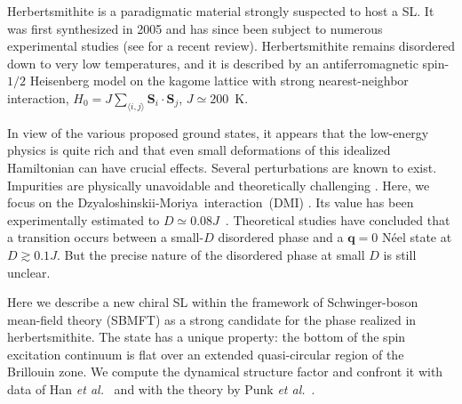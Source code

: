 \documentclass[aps,prl,twocolumn,superscriptaddress,showpacs,a4paper, longbibliography]{revtex4-1}
\newcommand{\DM}{Dzyaloshinskii-Moriya}
\begin{document}
Herbertsmithite is a paradigmatic material strongly suspected to host a SL.
It was first synthesized in 2005 \cite{Nocera} and has since been subject to numerous experimental studies \cite{Herbertsmithite_exp_H, Herbert_measurements, Mendels_Kag, DM_Bert, Herbert_measurements2, Nature_DM, Herbert_impurities, Zorko17_PRL.118.017202} (see \cite{Herbert_review} for a recent review).
Herbertsmithite remains disordered down to very low temperatures, and it is described by an antiferromagnetic spin-$1/2$ Heisenberg model on the kagome lattice with strong nearest-neighbor interaction, $H_0 = J\sum_{\langle i,j\rangle} \mathbf S_i\cdot \mathbf S_j$, $J \simeq 200$~K.

In view of the various proposed ground states, it appears that the low-energy physics is quite rich and that even small deformations of this idealized Hamiltonian can have crucial effects. Several perturbations are known to exist. Impurities are physically unavoidable \cite{Herbert_impurities} and theoretically challenging \cite{DM_impurity}.
Here, we focus on the \DM\ interaction~(DMI) \cite{Dzyaloshinskii, Moriya, DMsimple}. Its value has been experimentally estimated to $D\simeq0.08J$~\cite{DM_Bert}. Theoretical studies \cite{Elhajal, DM_Cepas, Moi_DM, DM_Fritz, DM_cluster, SFMFT_DM, Hering17_PRB.95.054418} have concluded that a transition occurs between a small-$D$ disordered phase and a $\mathbf q=0$  N\'eel state at $D \gtrsim 0.1J$.
But the precise nature of the disordered phase at small $D$ is still unclear.


Here we describe a new chiral SL within the framework of Schwinger-boson mean-field theory (SBMFT) as a strong candidate for the phase realized in herbertsmithite.
The state has a unique property: the bottom of the spin excitation continuum is flat over an extended quasi-circular region of the Brillouin zone.
We compute the dynamical structure factor and confront it with data of Han {\it et al.}~\cite{Nature_DM} and with the theory by Punk {\it et al.}~\cite{SBMFT_Nature}.
\end{document}
